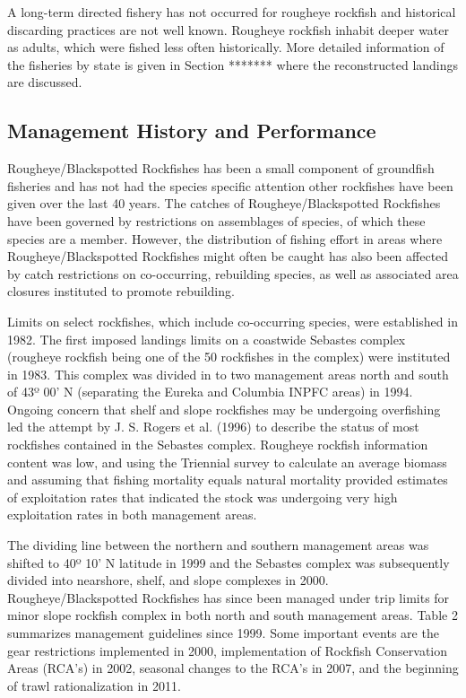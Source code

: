 \documentclass[
]{scrartcl}
\begin{document}
A long-term directed fishery has not occurred for rougheye rockfish and
historical discarding practices are not well known. Rougheye rockfish
inhabit deeper water as adults, which were fished less often
historically. More detailed information of the fisheries by state is
given in Section ******* where the reconstructed landings are discussed.

\subsection{Management History and
Performance}\label{management-history-and-performance}

Rougheye/Blackspotted Rockfishes has been a small component of
groundfish fisheries and has not had the species specific attention
other rockfishes have been given over the last 40 years. The catches of
Rougheye/Blackspotted Rockfishes have been governed by restrictions on
assemblages of species, of which these species are a member. However,
the distribution of fishing effort in areas where Rougheye/Blackspotted
Rockfishes might often be caught has also been affected by catch
restrictions on co-occurring, rebuilding species, as well as associated
area closures instituted to promote rebuilding.

Limits on select rockfishes, which include co-occurring species, were
established in 1982. The first imposed landings limits on a coastwide
Sebastes complex (rougheye rockfish being one of the 50 rockfishes in
the complex) were instituted in 1983. This complex was divided in to two
management areas north and south of 43º 00' N (separating the Eureka and
Columbia INPFC areas) in 1994. Ongoing concern that shelf and slope
rockfishes may be undergoing overfishing led the attempt by J. S. Rogers
et al. (1996) to describe the status of most rockfishes contained in the
Sebastes complex. Rougheye rockfish information content was low, and
using the Triennial survey to calculate an average biomass and assuming
that fishing mortality equals natural mortality provided estimates of
exploitation rates that indicated the stock was undergoing very high
exploitation rates in both management areas.

The dividing line between the northern and southern management areas was
shifted to 40º 10' N latitude in 1999 and the Sebastes complex was
subsequently divided into nearshore, shelf, and slope complexes in 2000.
Rougheye/Blackspotted Rockfishes has since been managed under trip
limits for minor slope rockfish complex in both north and south
management areas. Table 2 summarizes management guidelines since 1999.
Some important events are the gear restrictions implemented in 2000,
implementation of Rockfish Conservation Areas (RCA's) in 2002, seasonal
changes to the RCA's in 2007, and the beginning of trawl rationalization
in 2011.
\end{document}
